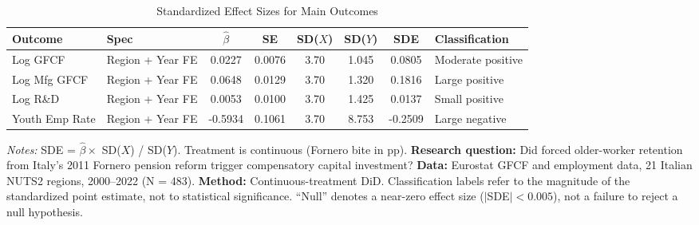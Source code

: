 \begin{table}[H]
\centering
\caption{Standardized Effect Sizes for Main Outcomes}
\label{tab:sde}
\small
\begin{adjustbox}{max width=\textwidth}
\begin{tabular}{llcccccl}
\toprule
Outcome & Spec & $\hat{\beta}$ & SE & SD($X$) & SD($Y$) & SDE & Classification \\
\midrule
Log GFCF & Region + Year FE & 0.0227 & 0.0076 & 3.70 & 1.045 & 0.0805 & Moderate positive \\
Log Mfg GFCF & Region + Year FE & 0.0648 & 0.0129 & 3.70 & 1.320 & 0.1816 & Large positive \\
Log R\&D & Region + Year FE & 0.0053 & 0.0100 & 3.70 & 1.425 & 0.0137 & Small positive \\
Youth Emp Rate & Region + Year FE & -0.5934 & 0.1061 & 3.70 & 8.753 & -0.2509 & Large negative \\
\bottomrule
\end{tabular}
\end{adjustbox}
\par\vspace{0.3em}
{\footnotesize \emph{Notes:} SDE = $\hat{\beta} \times$ SD($X$) / SD($Y$). Treatment is continuous (Fornero bite in pp). \textbf{Research question:} Did forced older-worker retention from Italy's 2011 Fornero pension reform trigger compensatory capital investment? \textbf{Data:} Eurostat GFCF and employment data, 21 Italian NUTS2 regions, 2000--2022 (N = 483). \textbf{Method:} Continuous-treatment DiD. Classification labels refer to the magnitude of the standardized point estimate, not to statistical significance. ``Null'' denotes a near-zero effect size ($|$SDE$| < 0.005$), not a failure to reject a null hypothesis.}
\end{table}

